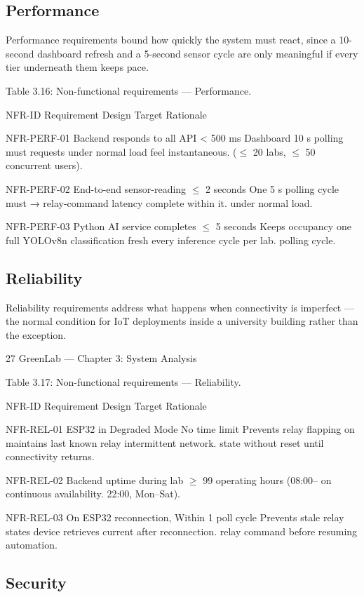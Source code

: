 \subsection{Performance}

Performance requirements bound how quickly the system must react, since a 10-second dashboard
refresh and a 5-second sensor cycle are only meaningful if every tier underneath them keeps pace.

Table 3.16: Non-functional requirements --- Performance.

NFR-ID Requirement Design Target Rationale

NFR-PERF-01 Backend responds to all API < 500 ms Dashboard 10 s polling must
requests under normal load feel instantaneous.
($\le$ 20 labs, $\le$ 50 concurrent
users).

NFR-PERF-02 End-to-end sensor-reading $\le$ 2 seconds One 5 s polling cycle must
→ relay-command latency complete within it.
under normal load.

NFR-PERF-03 Python AI service completes $\le$ 5 seconds Keeps occupancy
one full YOLOv8n classification fresh every
inference cycle per lab. polling cycle.


\subsection{Reliability}

Reliability requirements address what happens when connectivity is imperfect --- the normal
condition for IoT deployments inside a university building rather than the exception.




27
GreenLab --- Chapter 3: System Analysis


Table 3.17: Non-functional requirements --- Reliability.

NFR-ID Requirement Design Target Rationale

NFR-REL-01 ESP32 in Degraded Mode No time limit Prevents relay flapping on
maintains last known relay intermittent network.
state without reset until
connectivity returns.

NFR-REL-02 Backend uptime during lab $\ge$ 99%
operating hours (08:00-- on continuous availability.
22:00, Mon--Sat).

NFR-REL-03 On ESP32 reconnection, Within 1 poll cycle Prevents stale relay states
device retrieves current after reconnection.
relay command before
resuming automation.


\subsection{Security}

